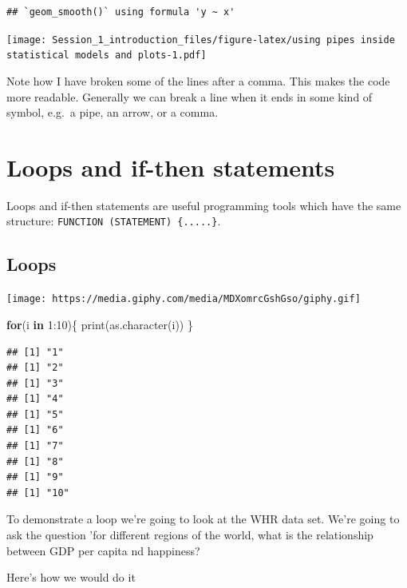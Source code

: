\documentclass[]{article}
\newenvironment{Shaded}{\begin{snugshade}}{\end{snugshade}}
\newcommand{\ControlFlowTok}[1]{\textcolor[rgb]{0.13,0.29,0.53}{\textbf{#1}}}
\newcommand{\DecValTok}[1]{\textcolor[rgb]{0.00,0.00,0.81}{#1}}
\newcommand{\FunctionTok}[1]{\textcolor[rgb]{0.00,0.00,0.00}{#1}}
\newcommand{\NormalTok}[1]{#1}
\newcommand{\SpecialCharTok}[1]{\textcolor[rgb]{0.00,0.00,0.00}{#1}}
\begin{document}
\begin{verbatim}
## `geom_smooth()` using formula 'y ~ x'
\end{verbatim}

\texttt{[image: Session\_1\_introduction\_files/figure-latex/using pipes inside statistical models and plots-1.pdf]}

Note how I have broken some of the lines after a comma. This makes the
code more readable. Generally we can break a line when it ends in some
kind of symbol, e.g.~a pipe, an arrow, or a comma.

\hypertarget{loops-and-if-then-statements}{%
\section{Loops and if-then
statements}\label{loops-and-if-then-statements}}

Loops and if-then statements are useful programming tools which have the
same structure: \texttt{FUNCTION\ (STATEMENT)\ \{.....\}}.

\hypertarget{loops}{%
\subsection{Loops}\label{loops}}

\texttt{[image: https://media.giphy.com/media/MDXomrcGshGso/giphy.gif]}

\begin{Shaded}
\begin{Highlighting}[]
\ControlFlowTok{for}\NormalTok{(i }\ControlFlowTok{in} \DecValTok{1}\SpecialCharTok{:}\DecValTok{10}\NormalTok{)\{}
  \FunctionTok{print}\NormalTok{(}\FunctionTok{as.character}\NormalTok{(i))}
\NormalTok{\}}
\end{Highlighting}
\end{Shaded}

\begin{verbatim}
## [1] "1"
## [1] "2"
## [1] "3"
## [1] "4"
## [1] "5"
## [1] "6"
## [1] "7"
## [1] "8"
## [1] "9"
## [1] "10"
\end{verbatim}

To demonstrate a loop we're going to look at the WHR data set. We're
going to ask the question 'for different regions of the world, what is
the relationship between GDP per capita nd happiness?

Here's how we would do it
\end{document}
